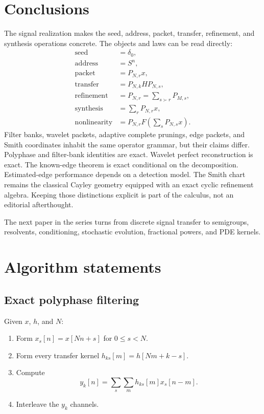 \documentclass[11pt,letterpaper]{article}
\theoremstyle{plain}
\theoremstyle{plain}
\theoremstyle{plain}
\theoremstyle{definition}
\theoremstyle{definition}
\theoremstyle{definition}
\theoremstyle{definition}
\theoremstyle{remark}
\theoremstyle{remark}
\theoremstyle{remark}
\theoremstyle{remark}
\begin{document}
\section{Conclusions}\label{core:section:17}

The signal realization makes the seed, address, packet, transfer, refinement, and synthesis operations concrete. The objects and laws can be read directly:
\[
\boxed{
\begin{aligned}
\text{seed}&=\delta_0,\\
\text{address}&=S^n,\\
\text{packet}&=P_{N,r}x,\\
\text{transfer}&=P_{N,k}HP_{N,s},\\
\text{refinement}&=P_{N,r}=\sum_{s\succ r}P_{M,s},\\
\text{synthesis}&=\sum_rP_{N,r}x,\\
\text{nonlinearity}&=P_{N,r}F\left(\sum_sP_{N,s}x\right).
\end{aligned}
}
\]
Filter banks, wavelet packets, adaptive complete prunings, edge packets, and Smith coordinates inhabit the same operator grammar, but their claims differ. Polyphase and filter-bank identities are exact. Wavelet perfect reconstruction is exact. The known-edge theorem is exact conditional on the decomposition. Estimated-edge performance depends on a detection model. The Smith chart remains the classical Cayley geometry equipped with an exact cyclic refinement algebra. Keeping those distinctions explicit is part of the calculus, not an editorial afterthought.

The next paper in the series turns from discrete signal transfer to semigroups, resolvents, conditioning, stochastic evolution, fractional powers, and PDE kernels.

\appendix
\section{Algorithm statements}\label{core:section:18}

\subsection{Exact polyphase filtering}

Given $x$, $h$, and $N$:

\begin{enumerate}
\item Form $x_s[n]=x[Nn+s]$ for $0\le s<N$.
\item Form every transfer kernel $h_{ks}[m]=h[Nm+k-s]$.
\item Compute
\[
y_k[n]=\sum_s\sum_mh_{ks}[m]x_s[n-m].
\]
\item Interleave the $y_k$ channels.
\end{enumerate}
\end{document}
